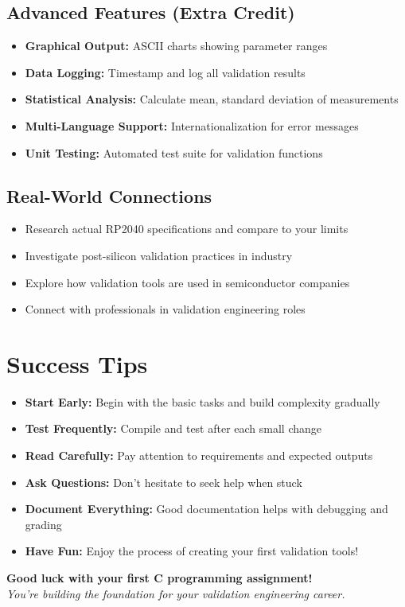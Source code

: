 \documentclass[11pt,a4paper]{article}
\begin{document}
\subsection{Advanced Features (Extra Credit)}
\begin{itemize}
    \item \textbf{Graphical Output:} ASCII charts showing parameter ranges
    \item \textbf{Data Logging:} Timestamp and log all validation results
    \item \textbf{Statistical Analysis:} Calculate mean, standard deviation of measurements
    \item \textbf{Multi-Language Support:} Internationalization for error messages
    \item \textbf{Unit Testing:} Automated test suite for validation functions
\end{itemize}

\subsection{Real-World Connections}
\begin{itemize}
    \item Research actual RP2040 specifications and compare to your limits
    \item Investigate post-silicon validation practices in industry
    \item Explore how validation tools are used in semiconductor companies
    \item Connect with professionals in validation engineering roles
\end{itemize}

\section{Success Tips}

\begin{itemize}
    \item \textbf{Start Early:} Begin with the basic tasks and build complexity gradually
    \item \textbf{Test Frequently:} Compile and test after each small change
    \item \textbf{Read Carefully:} Pay attention to requirements and expected outputs
    \item \textbf{Ask Questions:} Don't hesitate to seek help when stuck
    \item \textbf{Document Everything:} Good documentation helps with debugging and grading
    \item \textbf{Have Fun:} Enjoy the process of creating your first validation tools!
\end{itemize}

\vspace{1cm}

\begin{center}
\textbf{Good luck with your first C programming assignment!}\\
\textit{You're building the foundation for your validation engineering career.}
\end{center}
\end{document}
